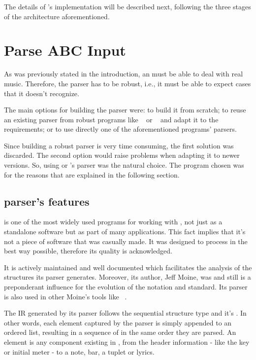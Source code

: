 The details of \abcdt{}'s implementation will be described next, following the three stages of the
architecture aforementioned.

\section{Parse ABC Input}
\label{sec:parse}

As was previously stated in the introduction, an \abcpt{} must be able to deal with real \abc{}
music. Therefore, the \abc{} parser has to be robust, i.e., it must be able to expect cases that it
doesn't recognize.

The main options for building the parser were: to build it from scratch; to reuse an existing parser
from robust programs like \abcmtops{}~\cite{abcm2ps:Online} or \abctomidi{}~\cite{abc2midi:Online}
and adapt it to the requirements; or to use directly one of the aforementioned programs' parsers.

Since building a robust parser is very time consuming, the first solution was discarded. The second
option would raise problems when adapting it to newer versions. So, using \abcmtops{} or
\abctomidi{}'s parser was the natural choice. The program chosen was \abcmtops{} for the reasons
that are explained in the following section.

\subsection{\abcmtops{} parser's features}

\abcmtops{} is one of the most widely used programs for working with \abc{}, not just as a
standalone software but as part of many applications. This fact implies that it's not a piece of
software that was casually made. It was designed to process \abc{} in the best way possible,
therefore its quality is acknowledged.

It is actively maintained and well documented which facilitates the analysis of the structures its
parser generates. Moreover, its author, Jeff Moine, was and still is a preponderant influence for
the evolution of the \abc{} notation and standard. Its parser is also used in other Moine's tools
like \tclabc{}~\cite{tclabc:Online}.

The \ac{IR} generated by its parser follows the sequential structure type and it's \sourcewise{}. In
other words, each element captured by the parser is simply appended to an ordered list, resulting in
a sequence of \abcelements{} in the same order they are parsed. An element is any component existing
in \abc{}, from the header information - like the key or initial meter - to a note, bar, a tuplet or
lyrics.

